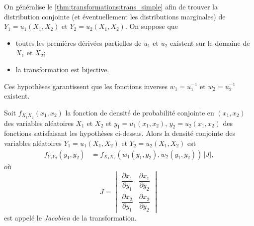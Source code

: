 On généralise le \autoref{thm:transformations:trans_simple} afin
de trouver la distribution conjointe (et éventuellement les
distributions marginales) de $Y_1 = u_1(X_1, X_2)$ et $Y_2 = u_2(X_1,
X_2)$. On suppose que
\begin{itemize}
\item toutes les premières dérivées partielles de $u_1$ et $u_2$
  existent sur le domaine de $X_1$ et $X_2$;
\item la transformation est bijective.
\end{itemize}
Ces hypothèses garantissent que les fonctions inverses $w_1 =
u_1^{-1}$ et $w_2 = u_2^{-1}$ existent.

\begin{thm}
  \label{thm:transformations:trans_multiple}
  Soit $f_{X_1 X_2}(x_1, x_2)$ la fonction de densité de probabilité
  conjointe en $(x_1, x_2)$ des variables aléatoires $X_1$ et $X_2$ et
  $y_1 = u_1(x_1, x_2)$, $y_2 = u_2(x_1, x_2)$ des fonctions
  satisfaisant les hypothèses ci-dessus. Alors la densité conjointe
  des variables aléatoires $Y_1 = u_1(X_1, X_2)$ et $Y_2 = u_2(X_1,
  X_2)$ est
  \begin{align*}
    f_{Y_1 Y_2}(y_1, y_2)
    &= f_{X_1 X_2}(w_1(y_1, y_2), w_2(y_1, y_2))\, |J|,
  \end{align*}
  où
  \begin{displaymath}
    J =
    \begin{vmatrix}
      \dfrac{\partial x_1}{\partial y_1} &
      \dfrac{\partial x_1}{\partial y_2} \\[12pt]
      \dfrac{\partial x_2}{\partial y_1} &
      \dfrac{\partial x_2}{\partial y_2}
    \end{vmatrix}
  \end{displaymath}
  est appelé le \emph{Jacobien} de la transformation.
\end{thm}


